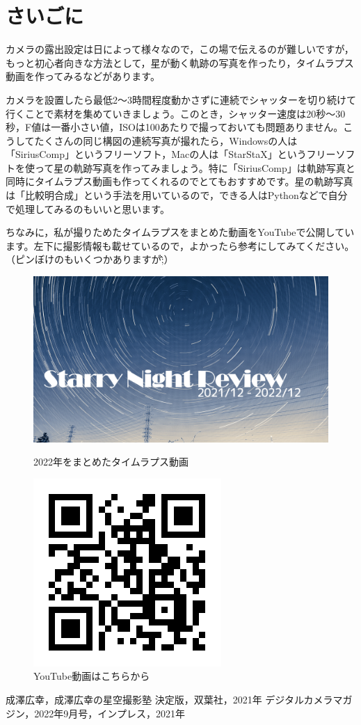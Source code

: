 \documentclass[../../super_nova_2023]{subfiles}
\begin{document}
\section{さいごに}
カメラの露出設定は日によって様々なので，この場で伝えるのが難しいですが，もっと初心者向きな方法として，星が動く軌跡の写真を作ったり，タイムラプス動画を作ってみるなどがあります。

カメラを設置したら最低2～3時間程度動かさずに連続でシャッターを切り続けて行くことで素材を集めていきましょう。このとき，シャッター速度は20秒～30秒，F値は一番小さい値，ISOは100あたりで撮っておいても問題ありません。こうしてたくさんの同じ構図の連続写真が撮れたら，Windowsの人は「SiriusComp」というフリーソフト，Macの人は「StarStaX」というフリーソフトを使って星の軌跡写真を作ってみましょう。特に「SiriusComp」は軌跡写真と同時にタイムラプス動画も作ってくれるのでとてもおすすめです。星の軌跡写真は「比較明合成」という手法を用いているので，できる人はPythonなどで自分で処理してみるのもいいと思います。

ちなみに，私が撮りためたタイムラプスをまとめた動画をYouTubeで公開しています。左下に撮影情報も載せているので，よかったら参考にしてみてください。（ピンぼけのもいくつかありますが\^\^;）
\begin{figure}[H]
	\centering
	\begin{minipage}{0.4\columnwidth}
		\centering
		\includegraphics[width=.8\columnwidth]{figures/Yosuke/Starry_Night_Review_thumbnail.png}
		\caption{2022年をまとめたタイムラプス動画}
		\label{fig:starry}
	\end{minipage}
	\begin{minipage}{0.4\columnwidth}
		\centering
		\includegraphics[width=.5\columnwidth]{figures/Yosuke/QR_031871.png}
		\caption{YouTube動画はこちらから}
		\label{fig:QR}
	\end{minipage}
\end{figure}

\begin{thebibliography}{1}
	 成澤広幸，成澤広幸の星空撮影塾 決定版，双葉社，2021年
	 デジタルカメラマガジン，2022年9月号，インプレス，2021年
\end{thebibliography}
\end{document}

